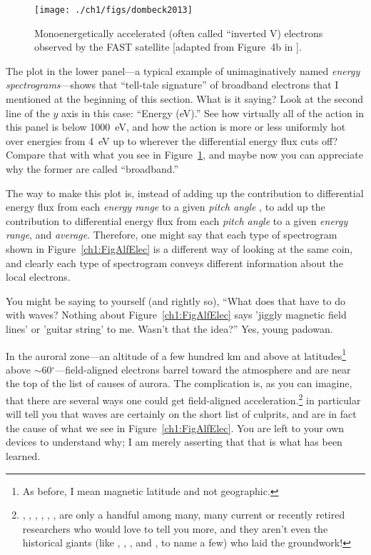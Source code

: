 
\begin{figure}
  \centering
  \noindent\texttt{[image: ./ch1/figs/dombeck2013]}
  \caption[Inverted V (monoenergetic) electrons]{Monoenergetically
    accelerated (often called ``inverted V) electrons observed by
    the FAST satellite [adapted from Figure~4b in \citealp{Dombeck2013}].}
  \label{ch1:FigDombeck}
\end{figure}


The plot in the lower panel---a typical example of unimaginatively
named \emph{energy spectrograms}---shows that ``tell-tale signature''
of broadband electrons that I mentioned at the beginning of this
section. What is it saying? Look at the second line of the $y$ axis in
this case: ``Energy (eV).'' See how virtually all of the action in
this panel is below 1000~eV, and how the action is more or less
uniformly hot over energies from 4~eV up to wherever the differential
energy flux cuts off? Compare that with what you see in
Figure~\ref{ch1:FigDombeck}, and maybe now you can appreciate why the
former are called ``broadband.'' 

The way to make this plot is, instead of adding up the contribution to
differential energy flux from each \emph{energy range} to a given
\emph{pitch angle} , to add up the contribution to differential energy
flux from each \emph{pitch angle} to a given \emph{energy range}, and
\emph{average}. Therefore, one might say that each type of spectrogram
shown in Figure~\ref{ch1:FigAlfElec} is a different way of looking at
the same coin, and clearly each type of spectrogram conveys different
information about the local electrons.

You might be saying to yourself (and rightly so), ``What does that
have to do with \Alf waves? Nothing about Figure~\ref{ch1:FigAlfElec}
says 'jiggly magnetic field lines' or 'guitar string' to me. Wasn't
that the idea?'' Yes, young padowan. 

In the auroral zone---an altitude of a few hundred km and above at
latitudes\footnote{As before, I mean magnetic latitude and not geographic.}
above $\sim$60$^\circ$---field-aligned electrons barrel toward the atmosphere
and are near the top of the list of causes of aurora. The complication is, as
you can imagine, that there are several ways one could get field-aligned
acceleration.\footnote{\citet{Wygant2002}, \citet{Bostrom2003a},
  \citet{Morooka2004}, \citet{Newell2009}, \citet{Hull2010}, \citet{Mottez2016},
  are only a handful among many, many current or recently retired researchers
  who would love to tell you more, and they aren't even the historical giants
  (like \citet{Knight1973}, \citet{Evans1974}, \citet{Hasegawa1976}, and
  \citet{Lyons1980a}, to name a few) who laid the groundwork!}
\citet{Chaston2002,Chaston2003a,Chaston2007,Chaston2008} in particular will tell
you that \Alf waves are certainly on the short list of culprits, and are in fact
the cause of what we see in Figure~\ref{ch1:FigAlfElec}. You are left to your
own devices to understand why; I am merely asserting that that is what has been
learned.

